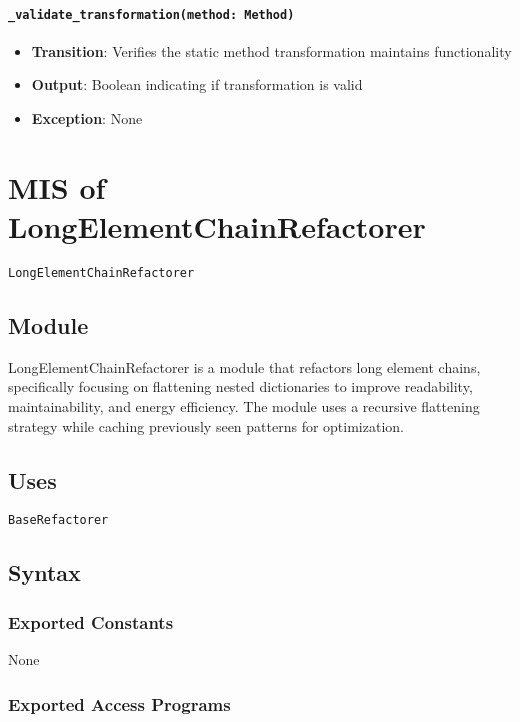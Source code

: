 \documentclass[12pt, titlepage]{article}
\begin{document}
\paragraph{\texttt{\_validate\_transformation(method: Method)}}
\begin{itemize}
  \item \textbf{Transition}: Verifies the static method transformation maintains functionality
  \item \textbf{Output}: Boolean indicating if transformation is valid
  \item \textbf{Exception}: None
\end{itemize}

\newpage  


\section{MIS of LongElementChainRefactorer} \label{mis:lec}

\texttt{LongElementChainRefactorer}

\subsection{Module}

LongElementChainRefactorer is a module that refactors long element chains, specifically focusing on flattening nested dictionaries to improve readability, maintainability, and energy efficiency. The module uses a recursive flattening strategy while caching previously seen patterns for optimization.

\subsection{Uses}

\texttt{BaseRefactorer}

\subsection{Syntax}

\subsubsection{Exported Constants}
None

\subsubsection{Exported Access Programs}
\end{document}
